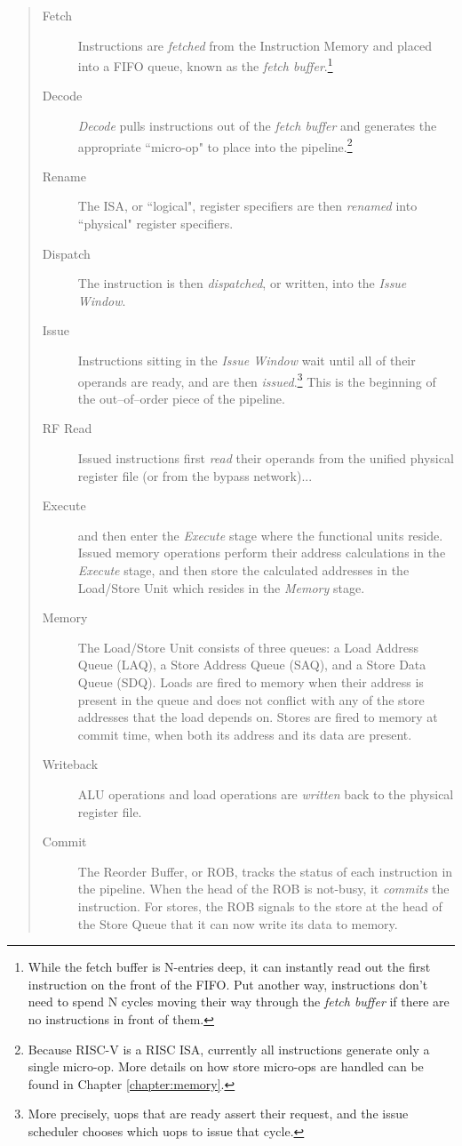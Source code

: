 \begin{quote}
\begin{description}
\item[Fetch]  Instructions are {\em fetched} from the Instruction Memory and placed into a FIFO queue, known as the {\em fetch buffer}.\footnote{While the fetch buffer is N-entries deep, it can instantly read out the first instruction on the front of the FIFO.  Put another way, instructions don't need to spend N cycles moving their way through the {\em fetch buffer} if there are no instructions in front of them.}
\item[Decode]
{\em Decode} pulls instructions out of the {\em fetch buffer} and generates the appropriate ``micro-op" to place into the pipeline.\footnote{Because RISC-V is a RISC ISA, currently all instructions generate only a single micro-op. More details on how store micro-ops are handled can be found in Chapter \ref{chapter:memory}.} 

\item[Rename]
 The ISA, or ``logical", register specifiers are then {\em renamed} into ``physical" register specifiers.
  
\item[Dispatch] The instruction is then {\em dispatched}, or written, into the {\em Issue Window}.  
 
\item[Issue]   Instructions sitting in the {\em Issue Window} wait until all of their operands are ready, and are then {\em issued}.\footnote{More precisely, uops that are ready assert their request, and the issue scheduler chooses which uops to issue that cycle.}  This is the beginning of the out--of--order piece of the pipeline.
\item[RF Read]  Issued instructions first {\em read} their operands from the unified physical register file (or from the bypass network)... 
\item[Execute] and then enter the {\em Execute} stage where the functional units reside.  Issued memory operations perform their address calculations in the {\em Execute} stage, and then store the calculated addresses in the Load/Store Unit which resides in the {\em Memory} stage.  
 
\item[Memory]  The Load/Store Unit consists of three queues: a Load Address Queue (LAQ), a Store Address Queue (SAQ), and a Store Data Queue (SDQ).  Loads are fired to memory when their address is present in the queue and does not conflict with any of the store addresses that the load depends on. Stores are fired to memory at commit time, when both its address and its data are present.  
 
\item[Writeback]  ALU operations and load operations are {\em written} back to the physical register file.
\item[Commit] The Reorder Buffer, or ROB, tracks the status of each instruction in the pipeline.  When the head of the ROB is not-busy, it {\em commits} the instruction.  For stores, the ROB signals to the store at the head of the Store Queue that it can now write its data to memory.
\end{description}
\end{quote}

